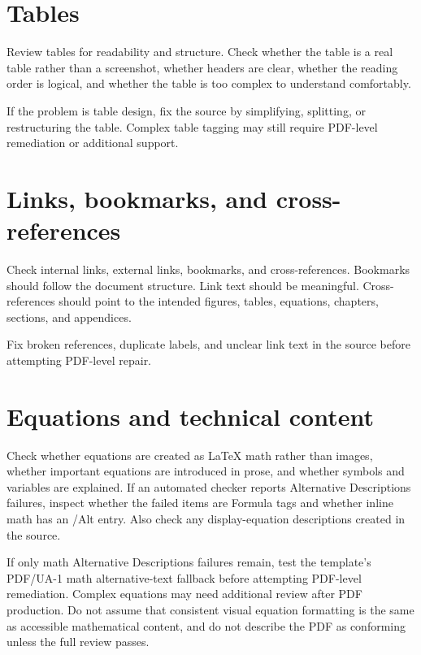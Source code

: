 \section{Tables}
\label{sec:tables-pdf-review}

Review tables for readability and structure. Check whether the table is a real table rather than a screenshot, whether headers are clear, whether the reading order is logical, and whether the table is too complex to understand comfortably.

If the problem is table design, fix the source by simplifying, splitting, or restructuring the table. Complex table tagging may still require PDF-level remediation or additional support.

\section{Links, bookmarks, and cross-references}
\label{sec:links-bookmarks-crossrefs}

Check internal links, external links, bookmarks, and cross-references. Bookmarks should follow the document structure. Link text should be meaningful. Cross-references should point to the intended figures, tables, equations, chapters, sections, and appendices.

Fix broken references, duplicate labels, and unclear link text in the source before attempting PDF-level repair.

\section{Equations and technical content}
\label{sec:equations-technical-pdf-review}

Check whether equations are created as \LaTeX{} math rather than images, whether important equations are introduced in prose, and whether symbols and variables are explained. If an automated checker reports Alternative Descriptions failures, inspect whether the failed items are Formula tags and whether inline math has an /Alt entry. Also check any display-equation descriptions created in the source.

If only math Alternative Descriptions failures remain, test the template's PDF/UA-1 math alternative-text fallback before attempting PDF-level remediation. Complex equations may need additional review after PDF production. Do not assume that consistent visual equation formatting is the same as accessible mathematical content, and do not describe the PDF as conforming unless the full review passes.

